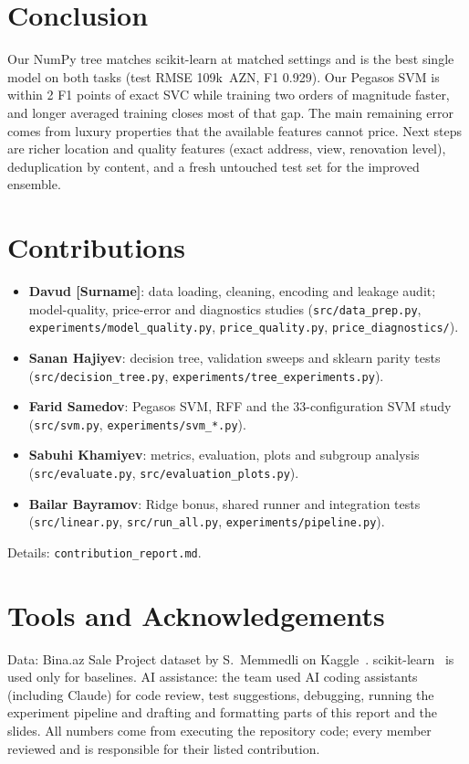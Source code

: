 \documentclass[10pt,twocolumn,a4paper]{article}
\newcommand{\DavudSurname}{[Surname]}
\begin{document}
\section{Conclusion}
Our NumPy tree matches scikit-learn at matched settings and is the best
single model on both tasks (test RMSE 109k~AZN, F1 0.929). Our Pegasos SVM is
within 2 F1 points of exact SVC while training two orders of magnitude
faster, and longer averaged training closes most of that gap. The main
remaining error comes from luxury properties that the available features
cannot price. Next steps are richer location and quality features (exact
address, view, renovation level), deduplication by content, and a fresh
untouched test set for the improved ensemble.

\section*{Contributions}
\begin{itemize}[leftmargin=0.8em,label={}]\raggedright
  \item \textbf{Davud \DavudSurname}: data loading, cleaning, encoding and
        leakage audit; model-quality, price-error and diagnostics studies
        (\texttt{src/data\_prep.py}, \texttt{experiments/model\_quality.py},
        \texttt{price\_quality.py}, \texttt{price\_diagnostics/}).
  \item \textbf{Sanan Hajiyev}: decision tree, validation sweeps and sklearn
        parity tests (\texttt{src/decision\_tree.py},
        \texttt{experiments/tree\_experiments.py}).
  \item \textbf{Farid Samedov}: Pegasos SVM, RFF and the 33-configuration SVM
        study (\texttt{src/svm.py}, \texttt{experiments/svm\_*.py}).
  \item \textbf{Sabuhi Khamiyev}: metrics, evaluation, plots and subgroup
        analysis (\texttt{src/evaluate.py}, \texttt{src/evaluation\_plots.py}).
  \item \textbf{Bailar Bayramov}: Ridge bonus, shared runner and integration
        tests (\texttt{src/linear.py}, \texttt{src/run\_all.py},
        \texttt{experiments/pipeline.py}).
\end{itemize}
Details: \texttt{contribution\_report.md}.

\section*{Tools and Acknowledgements}
Data: Bina.az Sale Project dataset by S.~Memmedli on Kaggle~\cite{data}.
scikit-learn~\cite{sklearn} is used only for baselines. AI assistance: the
team used AI coding assistants (including Claude) for code review, test
suggestions, debugging, running the experiment pipeline and drafting and
formatting parts of this report and the slides. All numbers come from
executing the repository code; every member reviewed and is responsible for
their listed contribution.
\end{document}
